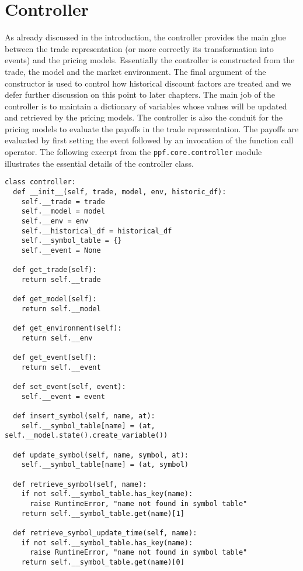 \section{Controller}
As already discussed in the introduction, the controller provides the
main glue between the trade representation (or more correctly its
transformation into events) and the pricing models. Essentially the
controller is constructed from the trade, the model and the market
environment. The final argument of the constructor is used to control
how historical discount factors are treated and we defer further
discussion on this point to later chapters. The main job of the
controller is to maintain a dictionary of variables whose values will
be updated and retrieved by the pricing models. The controller is also
the conduit for the pricing models to evaluate the payoffs in the
trade representation.  The payoffs are evaluated by first setting the
event followed by an invocation of the function call operator.  The
following excerpt from the \verb|ppf.core.controller| module
illustrates the essential details of the controller class. 
\begin{verbatim}
class controller:
  def __init__(self, trade, model, env, historic_df):
    self.__trade = trade
    self.__model = model
    self.__env = env
    self.__historical_df = historical_df
    self.__symbol_table = {}
    self.__event = None

  def get_trade(self):
    return self.__trade

  def get_model(self):
    return self.__model

  def get_environment(self):
    return self.__env

  def get_event(self):
    return self.__event

  def set_event(self, event):
    self.__event = event

  def insert_symbol(self, name, at):
    self.__symbol_table[name] = (at, self.__model.state().create_variable())

  def update_symbol(self, name, symbol, at):
    self.__symbol_table[name] = (at, symbol)

  def retrieve_symbol(self, name):
    if not self.__symbol_table.has_key(name):
      raise RuntimeError, "name not found in symbol table"
    return self.__symbol_table.get(name)[1]

  def retrieve_symbol_update_time(self, name):
    if not self.__symbol_table.has_key(name):
      raise RuntimeError, "name not found in symbol table"
    return self.__symbol_table.get(name)[0]
\end{verbatim}
